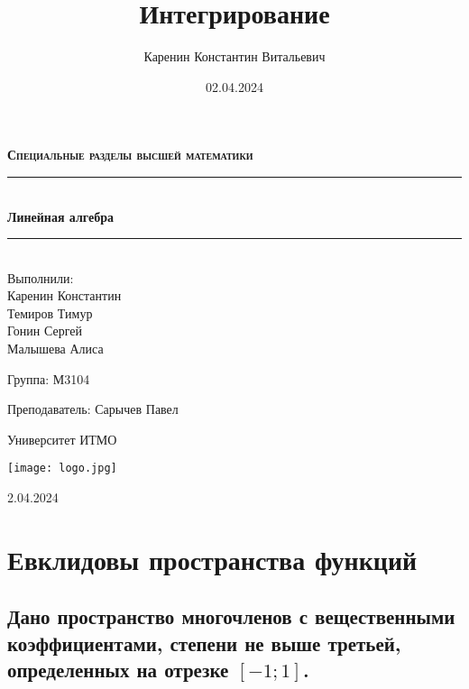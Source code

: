 \documentclass{article}
\title{Интегрирование}
\author{Каренин Константин Витальевич}
\date{02.04.2024}
\begin{document}
\begin{titlepage}
    \centering
    \vspace*{0.5 cm}
    
    \textsc{\LARGE \textbf{Специальные разделы высшей математики}}
    \vspace{1.5cm}
    
    \rule{\linewidth}{0.2 mm} \\[0.4 cm]
    { \huge \bfseries Линейная алгебра}
    \rule{\linewidth}{0.2 mm} \\[1.5 cm]
    
    \Large Выполнили: \\
    Каренин Константин \\
    Темиров Тимур \\
    Гонин Сергей \\
    Малышева Алиса \\
    
    \vspace{0.5cm}
    
    Группа: М3104
    
    \vspace{0.5cm}
    
    Преподаватель: Сарычев Павел
    
    \vspace{0.5cm}
    
    Университет ИТМО
    
    \vfill

    \texttt{[image: logo.jpg]}
    
    2.04.2024
    
\end{titlepage}

\setcounter{page}{2}

\newpage
    \section{Евклидовы пространства функций}
    \subsection{Дано пространство многочленов с вещественными коэффициентами, степени не выше третьей,
определенных на отрезке $[-1; 1]$.}
\end{document}
